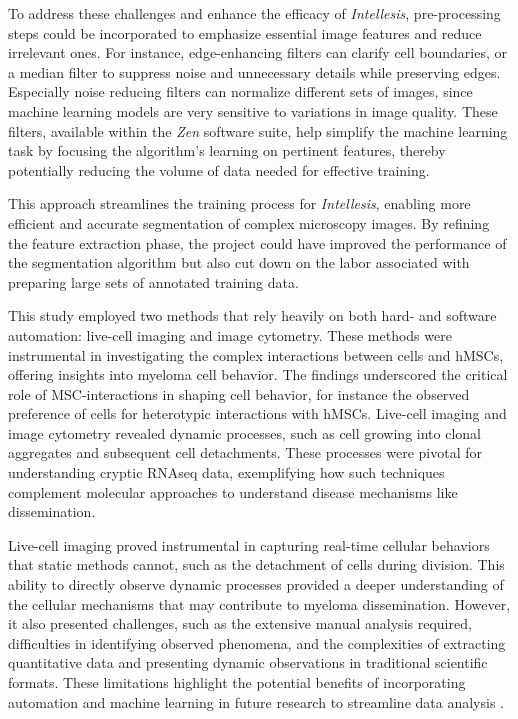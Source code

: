 To address these challenges and enhance the efficacy of \textit{Intellesis},
pre-processing steps could be incorporated to emphasize essential image features
and reduce irrelevant ones. For instance, edge-enhancing filters can
clarify cell boundaries, or a median filter to suppress noise and
unnecessary details while preserving edges. Especially noise reducing filters
can normalize different sets of images, since machine learning models are
very sensitive to variations in image quality.
These filters, available within the
\textit{Zen} software suite, help simplify the machine learning task by focusing
the algorithm's learning on pertinent features, thereby potentially reducing the
volume of data needed for effective training.

This approach streamlines the training process for \textit{Intellesis}, enabling
more efficient and accurate segmentation of complex microscopy images. By
refining the feature extraction phase, the project could have improved the
performance of the segmentation algorithm but also cut down on the labor
associated with preparing large sets of annotated training data.




\newpage
{}%
\label{sec:discussion_conclusion_microscopy}%
This study employed two methods that rely heavily on both hard- and software
automation: live-cell imaging and image cytometry. These methods were
instrumental in investigating the complex interactions between \INA cells and
hMSCs, offering insights into myeloma cell behavior. The findings
underscored the critical role of MSC-interactions in shaping cell behavior, for
instance the observed preference of \INA cells for heterotypic interactions with
hMSCs. Live-cell imaging and image cytometry revealed dynamic processes, such as
\INA cell growing into clonal aggregates and subsequent cell detachments. These
processes were pivotal for understanding cryptic RNAseq data, exemplifying how
such techniques complement molecular approaches to understand disease mechanisms
like dissemination.

Live-cell imaging proved instrumental in capturing real-time cellular behaviors
that static methods cannot, such as the detachment of \INA cells during
division. This ability to directly observe dynamic processes provided a deeper
understanding of the cellular mechanisms that may contribute to myeloma
dissemination.  However, it also presented challenges, such as the extensive
manual analysis required, difficulties in identifying observed phenomena, and
the complexities of extracting quantitative data and presenting dynamic
observations in traditional scientific formats. These limitations highlight the
potential benefits of incorporating automation and machine learning in future
research to streamline data analysis \cite{guptaDeepLearningImage2019,
    chengFrontiersDevelopmentLivecell2023}.

